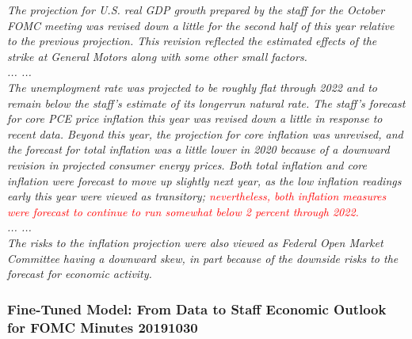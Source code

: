 {\footnotesize
\textit{The projection for U.S. real GDP growth prepared by the staff for the October FOMC meeting was revised down a little for the second half of this year relative to the previous projection.  This revision reflected the estimated effects of the strike at General Motors along with some other small factors. \\
... ...\\
The unemployment rate was projected to be roughly flat through 2022 and to remain below the staff’s estimate of its longerrun natural rate. The staff’s forecast for core PCE price inflation this year was revised down a little in response to recent data.  Beyond this year, the projection for core inflation was unrevised, and the forecast for total inflation was a little lower in 2020 because of a downward revision in projected consumer energy prices.  Both total inflation and core inflation were forecast to move up slightly next year, as the low inflation readings early this year were viewed as transitory; \textcolor{red}{nevertheless, both inflation measures were forecast to continue to run somewhat below 2 percent through 2022.}  \\
... ... \\
The risks to the inflation projection were also viewed as  Federal Open Market Committee having a downward skew, in part because of the downside risks to the forecast for economic activity. }
}

\subsubsection{Fine-Tuned Model: From Data to Staff Economic Outlook for FOMC Minutes 20191030}\label{ft_model}

